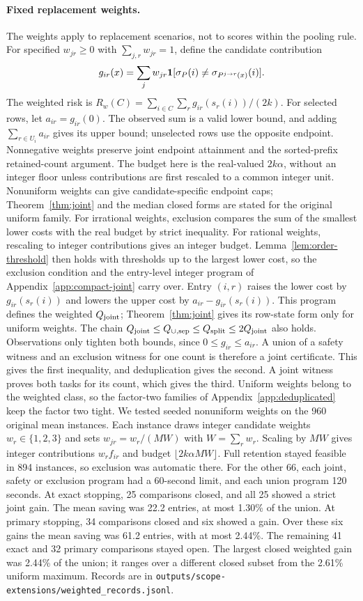 \paragraph{Fixed replacement weights.}
The weights apply to replacement scenarios, not to scores within the pooling rule. For specified $w_{jr}\ge0$ with $\sum_{j,r}w_{jr}=1$, define the candidate contribution
\[
 g_{ir}(x)=\sum_j w_{jr}\mathbf{1}[\sigma_P(i)\ne\sigma_{P^{j\to r}(x)}(i)].
\]
The weighted risk is $R_w(C)=\sum_{i\in C}\sum_r g_{ir}(s_r(i))/(2k)$. For selected rows, let $a_{ir}=g_{ir}(0)$. The observed sum is a valid lower bound, and adding $\sum_{r\in U_i}a_{ir}$ gives its upper bound; unselected rows use the opposite endpoint. Nonnegative weights preserve joint endpoint attainment and the sorted-prefix retained-count argument. The budget here is the real-valued $2k\alpha$, without an integer floor unless contributions are first rescaled to a common integer unit. Nonuniform weights can give candidate-specific endpoint caps; Theorem~\ref{thm:joint} and the median closed forms are stated for the original uniform family. For irrational weights, exclusion compares the sum of the smallest lower costs with the real budget by strict inequality. For rational weights, rescaling to integer contributions gives an integer budget. Lemma~\ref{lem:order-threshold} then holds with thresholds up to the largest lower cost, so the exclusion condition and the entry-level integer program of Appendix~\ref{app:compact-joint} carry over. Entry $(i,r)$ raises the lower cost by $g_{ir}(s_r(i))$ and lowers the upper cost by $a_{ir}-g_{ir}(s_r(i))$. This program defines the weighted $Q_{\rm joint}$; Theorem~\ref{thm:joint} gives its row-state form only for uniform weights. The chain $Q_{\rm joint}\le Q_{\cup,\rm sep}\le Q_{\rm split}\le2Q_{\rm joint}$ also holds. Observations only tighten both bounds, since $0\le g_{ir}\le a_{ir}$. A union of a safety witness and an exclusion witness for one count is therefore a joint certificate. This gives the first inequality, and deduplication gives the second. A joint witness proves both tasks for its count, which gives the third. Uniform weights belong to the weighted class, so the factor-two families of Appendix~\ref{app:deduplicated} keep the factor two tight. We tested seeded nonuniform weights on the 960 original mean instances. Each instance draws integer candidate weights $w_r\in\{1,2,3\}$ and sets $w_{jr}=w_r/(MW)$ with $W=\sum_rw_r$. Scaling by $MW$ gives integer contributions $w_rf_{ir}$ and budget $\lfloor2k\alpha MW\rfloor$. Full retention stayed feasible in 894 instances, so exclusion was automatic there. For the other 66, each joint, safety or exclusion program had a 60-second limit, and each union program 120 seconds. At exact stopping, 25 comparisons closed, and all 25 showed a strict joint gain. The mean saving was 22.2 entries, at most 1.30\% of the union. At primary stopping, 34 comparisons closed and six showed a gain. Over these six gains the mean saving was 61.2 entries, with at most 2.44\%. The remaining 41 exact and 32 primary comparisons stayed open. The largest closed weighted gain was 2.44\% of the union; it ranges over a different closed subset from the 2.61\% uniform maximum. Records are in \nolinkurl{outputs/scope-extensions/weighted_records.jsonl}.

